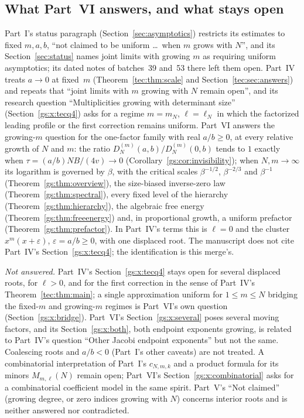\documentclass[11pt,a4paper]{article}
\numberwithin{equation}{section}
\theoremstyle{definition}
\theoremstyle{remark}
\begin{document}
\subsection{What Part~VI answers, and what stays open}\label{gs:sec:answers}
Part~I's status paragraph (Section~\ref{sec:asymptotics}) restricts its
estimates to fixed $m,a,b$, ``not claimed to be uniform \dots\ when $m$
grows with $N$'', and its Section~\ref{sec:status} names joint limits with
growing $m$ as requiring uniform asymptotics; its dated notes of batches~39
and~53 there left them open.  Part~IV treats $a\to0$ at fixed~$m$
(Theorem~\ref{tec:thm:scale} and Section~\ref{tec:sec:answers}) and
repeats that ``joint limits with $m$ growing with $N$ remain open'', and its
research question ``Multiplicities growing with determinant size''
(Section~\ref{gs:x:tecq4}) asks for a regime $m=m_N$, $\ell=\ell_N$ in which
the factorized leading profile or the first correction remains uniform.
Part~VI answers the growing-$m$ question for the one-factor family with real
$a/b\ge0$, at every relative growth of $N$ and $m$: the ratio
$D_N^{(m)}(a,b)/D_N^{(m)}(0,b)$ tends to $1$ exactly when
$\tau=(a/b)NB/(4v)\to0$ (Corollary~\ref{gs:cor:invisibility}); when
$N,m\to\infty$ its logarithm is governed by $\beta$, with the critical
scales $\beta^{-1/2}$, $\beta^{-2/3}$ and $\beta^{-1}$
(Theorem~\ref{gs:thm:overview}), the size-biased inverse-zero law
(Theorem~\ref{gs:thm:spectral}), every fixed level of the hierarchy
(Theorem~\ref{gs:thm:hierarchy}), the algebraic free energy
(Theorem~\ref{gs:thm:freeenergy}) and, in proportional growth, a uniform
prefactor (Theorem~\ref{gs:thm:prefactor}).  In Part~IV's terms this is
$\ell=0$ and the cluster $x^m(x+\varepsilon)$, $\varepsilon=a/b\ge0$, with
one displaced root.  The manuscript does not cite Part~IV's
Section~\ref{gs:x:tecq4}; the identification is this merge's.

\emph{Not answered.}  Part~IV's Section~\ref{gs:x:tecq4} stays open for
several displaced roots, for $\ell>0$, and for the first correction in the
sense of Part~IV's Theorem~\ref{tec:thm:main}; a single approximation
uniform for $1\le m\le N$ bridging the fixed-$m$ and growing-$m$ regimes is
Part~VI's own question (Section~\ref{gs:x:bridge}).  Part~VI's
Section~\ref{gs:x:several} poses several moving factors, and its
Section~\ref{gs:x:both}, both endpoint exponents growing, is related to
Part~IV's question ``Other Jacobi endpoint exponents'' but not the same.
Coalescing roots and $a/b<0$ (Part~I's other caveats) are not treated.  A
combinatorial interpretation of Part~I's $c_{N,m,k}$ and a product formula
for its minors $M_{m,\ell}(N)$ remain open; Part~VI's
Section~\ref{gs:x:combinatorial} asks for a combinatorial coefficient model
in the same spirit.  Part~V's ``Not claimed'' (growing degree, or zero
indices growing with $N$) concerns interior roots and is neither answered
nor contradicted.
\end{document}

